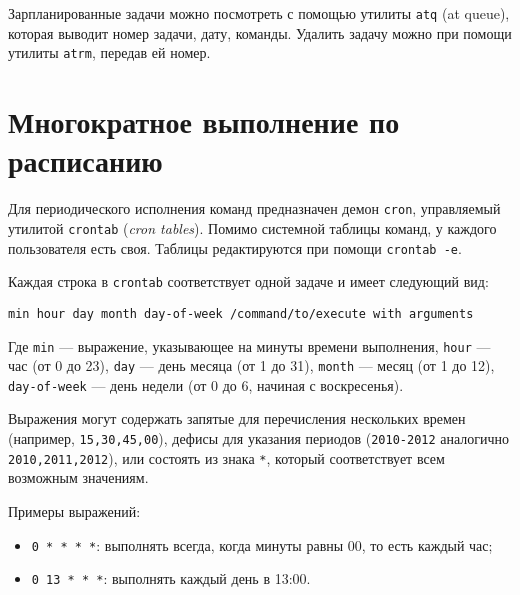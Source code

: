 \documentclass[listings]{labreport}
\begin{document}
Зарпланированные задачи можно посмотреть с помощью утилиты \texttt{atq} (at queue), которая выводит номер задачи, дату, команды.
Удалить задачу можно при помощи утилиты \texttt{atrm}, передав ей номер.

\section*{Многократное выполнение по расписанию}

Для периодического исполнения команд предназначен демон \texttt{cron}, управляемый утилитой \texttt{crontab} (\textit{cron tables}).
Помимо системной таблицы команд, у каждого пользователя есть своя. Таблицы редактируются при помощи \texttt{crontab -e}.

Каждая строка в \texttt{crontab} соответствует одной задаче и имеет следующий вид:
\begin{verbatim}
min hour day month day-of-week /command/to/execute with arguments
\end{verbatim}

Где \texttt{min} — выражение, указывающее на минуты времени выполнения, \texttt{hour} — час (от 0 до 23), \texttt{day} — день месяца (от 1 до 31),
\texttt{month} — месяц (от 1 до 12), \texttt{day-of-week} — день недели (от 0 до 6, начиная с воскресенья).

Выражения могут содержать запятые для перечисления нескольких времен (например, \texttt{15,30,45,00}), дефисы для указания
периодов (\texttt{2010-2012} аналогично \texttt{2010,2011,2012}), или состоять из знака \texttt{*}, который соответствует
всем возможным значениям.

Примеры выражений:
\begin{itemize}
\item \texttt{0 * * * *}: выполнять всегда, когда минуты равны 00, то есть каждый час;
\item \texttt{0 13 * * *}: выполнять каждый день в 13:00.
\end{itemize}
\end{document}
